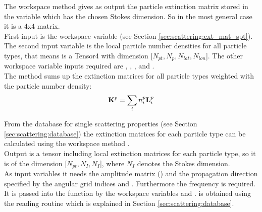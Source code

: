 \label{sec:scattering:ext_mat_part}

The workspace method  gives as output the
particle extinction matrix  stored in the variable
 which has the chosen Stokes dimension. So in
the most general case it is a 4x4 matrix.\\
First input is the workspace variable  (see Section
\ref{sec:scattering:ext_mat_spt}). The second input variable is the
local particle number densities  for all particle types,
that means  is a Tensor4 with dimension 
[$N_{pt}, N_{p}, N_{lat}, N_{lon}$]. The other workspace variable
inputs required are , ,
, and . \\
The method sums up the extinction matrices for all particle types
weighted with the particle number density:
\begin{eqnarray}
  {\bf K}^{p} = \sum_i n^p_i {\bf L}^{p}_i 
\end{eqnarray}


\label{sec:scattering:ext_mat_gas}

\label{sec:scattering:ext_mat_spt}

From the database for single scattering properties (see Section 
\ref{sec:scattering:database}) the extinction matrices for each
particle type can be calculated using the workspace method
.\\
Output is a tensor including local extinction matrices for each
particle type, so it is of the dimension [$N_{pt}, N_{I}, N_{I}$],
where $N_{I}$ denotes the Stokes dimension.\\
As input variables it needs the amplitude matrix ()
and the propagation direction specified by the angular grid indices
 and . Furthermore the
frequency is required. It is passed into the function by the workspace
variables  and .
 is
obtained using the reading routine  which is
explained in Section \ref{sec:scattering:database}.


